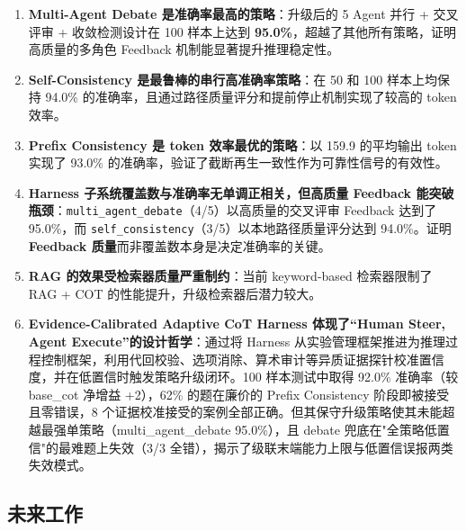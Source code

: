 \documentclass[lang=cn,a4paper,newtx]{elegantpaper}
\begin{document}
\begin{enumerate}
  \item \textbf{Multi-Agent Debate 是准确率最高的策略}：升级后的 5 Agent 并行 + 交叉评审 + 收敛检测设计在 100 样本上达到 \textbf{95.0\%}，超越了其他所有策略，证明高质量的多角色 Feedback 机制能显著提升推理稳定性。
  \item \textbf{Self-Consistency 是最鲁棒的串行高准确率策略}：在 50 和 100 样本上均保持 94.0\% 的准确率，且通过路径质量评分和提前停止机制实现了较高的 token 效率。
  \item \textbf{Prefix Consistency 是 token 效率最优的策略}：以 159.9 的平均输出 token 实现了 93.0\% 的准确率，验证了截断再生一致性作为可靠性信号的有效性。
  \item \textbf{Harness 子系统覆盖数与准确率无单调正相关，但高质量 Feedback 能突破瓶颈}：\texttt{multi\_agent\_debate}（4/5）以高质量的交叉评审 Feedback 达到了 95.0\%，而 \texttt{self\_consistency}（3/5）以本地路径质量评分达到 94.0\%。证明\textbf{Feedback 质量}而非覆盖数本身是决定准确率的关键。
  \item \textbf{RAG 的效果受检索器质量严重制约}：当前 keyword-based 检索器限制了 RAG + COT 的性能提升，升级检索器后潜力较大。
  \item \textbf{Evidence-Calibrated Adaptive CoT Harness 体现了“Human Steer, Agent Execute”的设计哲学}：通过将 Harness 从实验管理框架推进为推理过程控制框架，利用代回校验、选项消除、算术审计等异质证据探针校准置信度，并在低置信时触发策略升级闭环。100 样本测试中取得 92.0\% 准确率（较 base\_cot 净增益 +2），62\% 的题在廉价的 Prefix Consistency 阶段即被接受且零错误，8 个证据校准接受的案例全部正确。但其保守升级策略使其未能超越最强单策略（multi\_agent\_debate 95.0\%），且 debate 兜底在"全策略低置信"的最难题上失效（3/3 全错），揭示了级联末端能力上限与低置信误报两类失效模式。
\end{enumerate}

\subsection{未来工作}
\end{document}
